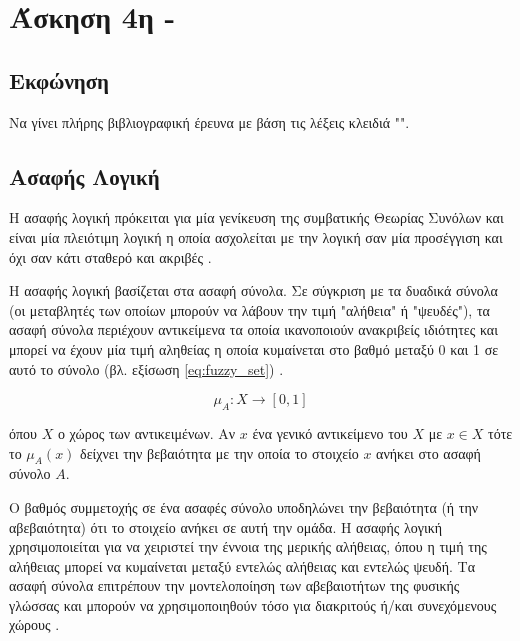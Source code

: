 \documentclass{assignment}
\begin{document}
\section{Άσκηση 4η - }
\subsection{Εκφώνηση}

Να γίνει πλήρης βιβλιογραφική έρευνα με βάση τις λέξεις κλειδιά "".

\subsection {Ασαφής Λογική}

Η ασαφής λογική πρόκειται για μία γενίκευση της συμβατικής Θεωρίας Συνόλων και είναι μία πλειότιμη λογική η οποία ασχολείται με την λογική σαν μία προσέγγιση και όχι σαν κάτι σταθερό και ακριβές \cite{engelbrecht,class_notes,wiki:fuzzy_logic,zadeh1994}. %

Η ασαφής λογική βασίζεται στα ασαφή σύνολα. Σε σύγκριση με τα δυαδικά σύνολα (οι μεταβλητές των οποίων μπορούν να λάβουν την τιμή "αλήθεια" ή "ψευδές"), τα ασαφή σύνολα περιέχουν αντικείμενα τα οποία ικανοποιούν ανακριβείς ιδιότητες και μπορεί να έχουν μία τιμή αληθείας η οποία κυμαίνεται στο βαθμό μεταξύ 0 και 1 σε αυτό το σύνολο (βλ. εξίσωση \eqref{eq:fuzzy_set}) \cite{zadeh1965338}. 

\begin{equation}
\mu_A : X \rightarrow [0,1]
\label{eq:fuzzy_set}
\end{equation}

όπου $X$ ο χώρος των αντικειμένων. Αν $x$ ένα γενικό αντικείμενο του $X$ με $x \in X$ τότε το $\mu_A(x)$ δείχνει την βεβαιότητα με την οποία το στοιχείο $x$ ανήκει στο ασαφή σύνολο $A$.

Ο βαθμός συμμετοχής σε ένα ασαφές σύνολο υποδηλώνει την βεβαιότητα (ή την αβεβαιότητα) ότι το στοιχείο ανήκει σε αυτή την ομάδα. Η ασαφής λογική χρησιμοποιείται για να χειριστεί την έννοια της μερικής αλήθειας, όπου η τιμή της αλήθειας μπορεί να κυμαίνεται μεταξύ εντελώς αλήθειας και εντελώς ψευδή. Τα ασαφή σύνολα επιτρέπουν την μοντελοποίηση των αβεβαιοτήτων της φυσικής γλώσσας και μπορούν να χρησιμοποιηθούν τόσο για διακριτούς ή/και συνεχόμενους χώρους \cite{engelbrecht,class_notes,wiki:fuzzy_logic}. 
\end{document}
